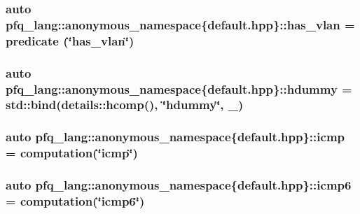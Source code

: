 \hypertarget{namespacepfq__lang_1_1anonymous__namespace_02default_8hpp_03_a30a0c8d9bcd28cd17c6c1699c3339c3f}{
\subsubsection[{has\-\_\-vlan}]{\setlength{\rightskip}{0pt plus 5cm}auto pfq\-\_\-lang\-::anonymous\-\_\-namespace\{default.\-hpp\}\-::has\-\_\-vlan = {\bf predicate} (\char`\"{}has\-\_\-vlan\char`\"{})}}\label{namespacepfq__lang_1_1anonymous__namespace_02default_8hpp_03_a30a0c8d9bcd28cd17c6c1699c3339c3f}
\hypertarget{namespacepfq__lang_1_1anonymous__namespace_02default_8hpp_03_a4e7cf4874b42c5722f420fc54f360242}{
\subsubsection[{hdummy}]{\setlength{\rightskip}{0pt plus 5cm}auto pfq\-\_\-lang\-::anonymous\-\_\-namespace\{default.\-hpp\}\-::hdummy = std\-::bind(details\-::hcomp(), \char`\"{}hdummy\char`\"{}, \-\_)}}\label{namespacepfq__lang_1_1anonymous__namespace_02default_8hpp_03_a4e7cf4874b42c5722f420fc54f360242}
\hypertarget{namespacepfq__lang_1_1anonymous__namespace_02default_8hpp_03_a180c8185595965a528fd2590da7dbeb9}{
\subsubsection[{icmp}]{\setlength{\rightskip}{0pt plus 5cm}auto pfq\-\_\-lang\-::anonymous\-\_\-namespace\{default.\-hpp\}\-::icmp = {\bf computation}(\char`\"{}icmp\char`\"{})}}\label{namespacepfq__lang_1_1anonymous__namespace_02default_8hpp_03_a180c8185595965a528fd2590da7dbeb9}
\hypertarget{namespacepfq__lang_1_1anonymous__namespace_02default_8hpp_03_ab1e01b177ae34e48f61eed78580aeac0}{
\subsubsection[{icmp6}]{\setlength{\rightskip}{0pt plus 5cm}auto pfq\-\_\-lang\-::anonymous\-\_\-namespace\{default.\-hpp\}\-::icmp6 = {\bf computation}(\char`\"{}icmp6\char`\"{})}}\label{namespacepfq__lang_1_1anonymous__namespace_02default_8hpp_03_ab1e01b177ae34e48f61eed78580aeac0}
